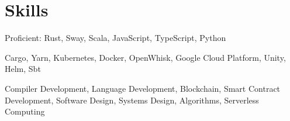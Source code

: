 \section{Skills}

%
{}%
{}%
{\small Proficient: Rust, Sway, Scala, JavaScript, TypeScript, Python%
\normalsize}%
{}

%
{}%
{}%
{\small Cargo, Yarn, Kubernetes, Docker, OpenWhisk, Google Cloud Platform, Unity, Helm, Sbt \normalsize}%
{}

%
{}%
{}%
{\small Compiler Development, Language Development, Blockchain, Smart Contract Development,
Software Design, Systems Design, Algorithms, Serverless Computing\normalsize}%
{}

